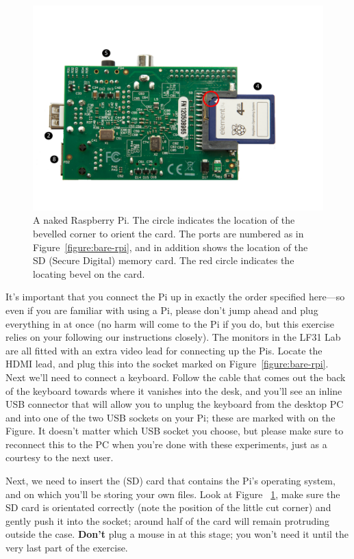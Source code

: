 \begin{figure}
\centerline{\includegraphics[width=15cm]{images/bare-rpi-underside-annotated}}
\caption{A naked Raspberry Pi. The circle indicates the location of the bevelled corner to orient the card. The ports are numbered as in Figure~\ref{figure:bare-rpi}, and in addition \protect{} shows the location of the SD (Secure Digital) memory card. The red circle indicates the locating bevel on the card.}\label{figure:bare-rpi-underside}
\end{figure}

It's important that you connect the Pi up in exactly the order specified here---so even if you are familiar with using a Pi, please don't jump ahead and plug everything in at once (no harm will come to the Pi if you do, but this exercise relies on your following our instructions closely). The monitors in the LF31 Lab are all fitted with an extra video lead for connecting up the Pis. Locate the HDMI lead, and plug this into the socket marked  on Figure~\ref{figure:bare-rpi}. Next we'll need to connect a keyboard. Follow the cable that comes out the back of the keyboard towards where it vanishes into the desk, and you'll see an inline USB connector that will allow you to unplug the keyboard from the desktop PC and into one of the two USB sockets on your Pi; these are marked with  on the Figure. It doesn't matter which USB socket you choose, but please make sure to reconnect this to the PC when you're done with these experiments, just as a courtesy to the next user. 

Next, we need to insert the  (SD) card that contains the Pi's operating system, and on which you'll be storing your own files. Look at Figure ~\ref{figure:bare-rpi-underside}, make sure the SD card is orientated correctly (note the position of the little cut corner) and gently push it into the socket; around half of the card will remain protruding outside the case. \textbf{Don't} plug a mouse in at this stage; you won't need it until the very last part of the exercise.

